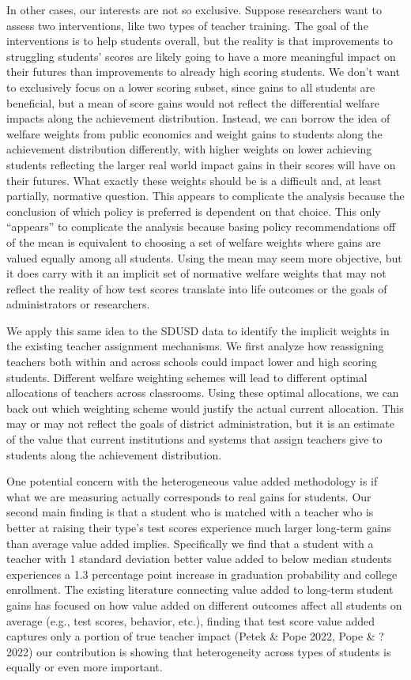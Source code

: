 \documentclass{article}
\theoremstyle{definition}
\theoremstyle{definition}
\theoremstyle{definition}
\begin{document}
In other cases, our interests are not so exclusive. Suppose researchers want to assess two interventions, like two types of teacher training. The goal of the interventions is to help students overall, but the reality is that improvements to struggling students' scores are likely going to have a more meaningful impact on their futures than improvements to already high scoring students. We don’t want to exclusively focus on a lower scoring subset, since gains to all students are beneficial, but a mean of score gains would not reflect the differential welfare impacts along the achievement distribution. Instead, we can borrow the idea of welfare weights from public economics and weight gains to students along the achievement distribution differently, with higher weights on lower achieving students reflecting the larger real world impact gains in their scores will have on their futures. What exactly these weights should be is a difficult and, at least partially, normative question. This appears to complicate the analysis because the conclusion of which policy is preferred is dependent on that choice. This only “appears” to complicate the analysis because basing policy recommendations off of the mean is equivalent to choosing a set of welfare weights where gains are valued equally among all students. Using the mean may seem more objective, but it does carry with it an implicit set of normative welfare weights that may not reflect the reality of how test scores translate into life outcomes or the goals of administrators or researchers. 

We apply this same idea to the SDUSD data to identify the implicit weights in the existing teacher assignment mechanisms. We first analyze how reassigning teachers both within and across schools could impact lower and high scoring students. Different welfare weighting schemes will lead to different optimal allocations of teachers across classrooms. Using these optimal allocations, we can back out which weighting scheme would justify the actual current allocation. This may or may not reflect the goals of district administration, but it is an estimate of the value that current institutions and systems that assign teachers give to students along the achievement distribution. 

One potential concern with the heterogeneous value added methodology is if what we are measuring actually corresponds to real gains for students. Our second main finding is that a student who is matched with a teacher who is better at raising their type’s test scores experience much larger long-term gains than average value added implies. Specifically we find that a student with a teacher with 1 standard deviation better value added to below median students experiences a 1.3 percentage point increase in graduation probability and college enrollment. The existing literature connecting value added to long-term student gains has focused on how value added on different outcomes affect all students on average (e.g., test scores, behavior, etc.), finding that test score value added captures only a portion of true teacher impact (Petek & Pope 2022, Pope & ? 2022) our contribution is showing that heterogeneity across types of students is equally or even more important.
\end{document}
